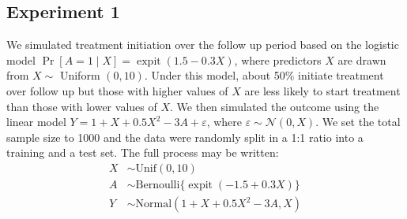 \subsection{Experiment 1}
We simulated treatment initiation over the follow up period based on the logistic model $\Pr[A=1 \mid X]=\operatorname{expit} (1.5-0.3 X)$, where predictors $X$ are drawn from $X \sim$ Uniform $(0,10)$. Under this model, about 50\% initiate treatment over follow up but those with higher values of $X$ are less likely to start treatment than those with lower values of $X$. We then simulated the outcome using the linear model $Y=1+X+0.5 X^2- 3A + \varepsilon$, where $\varepsilon \sim \mathcal{N}(0, X)$.  We set the total sample size to 1000 and the data were randomly split in a 1:1 ratio into a training and a test set. The full process may be written:
\begin{align*}
    X & \sim \text{Unif}(0, 10) \\
    A & \sim \text{Bernoulli}\{\operatorname{expit}(-1.5 + 0.3 X)\} \\
    Y & \sim \text{Normal}(1 + X + 0.5 X^2 - 3 A, X)
\end{align*}    
 
